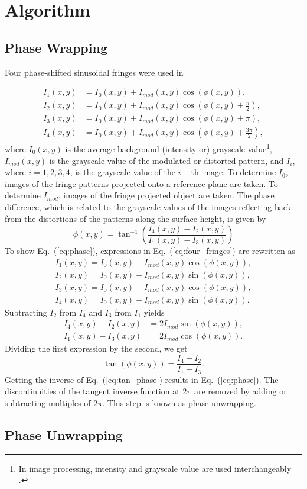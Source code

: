 \section{Algorithm}

\subsection{Phase Wrapping}
Four phase-shifted sinusoidal fringes were used in 

\begin{align}
I_1(x,y)&=I_0(x,y) + I_{mod}(x,y)\cos{(\phi(x,y))}, \nonumber\\
I_2(x,y)&=I_0(x,y) + I_{mod}(x,y)\cos{(\phi(x,y)+\frac{\pi}{2})}, \nonumber\\
I_3(x,y)&=I_0(x,y) + I_{mod}(x,y)\cos{(\phi(x,y)+\pi)},\nonumber\\
I_4(x,y)&=I_0(x,y) + I_{mod}(x,y)\cos{(\phi(x,y)+\frac{3\pi}{2})},
\label{eq:four_fringes}
\end{align}  
where $I_0(x,y)$ is the average background (intensity or) grayscale value\footnote{In image processing, intensity and grayscale value are used interchangeably \cite{Gonzales}.}, $I_{mod}(x,y)$ is the grayscale value of the modulated or distorted pattern, and $I_i$, where $i=1,2,3,4$, is the grayscale value of the $i-$th image. To determine $I_0$, images of the fringe patterns projected onto a reference plane are taken. 
To determine $I_{mod}$, images of the fringe projected object are taken. 
The phase difference, which is related to the grayscale values of the images reflecting back from the distortions of the patterns along the surface height, is given by
\begin{equation}
\phi(x,y)=\tan^{-1}{\left( \frac{I_4(x,y) - I_2(x,y)}{I_1(x,y)- I_3(x,y)}\right)}
\label{eq:phase}
\end{equation}
To show Eq.~(\ref{eq:phase}), expressions in Eq.~(\ref{eq:four_fringes}) are rewritten as 
\begin{align}
I_1(x,y)=I_0(x,y) + I_{mod}(x,y)\cos{(\phi(x,y))}, \nonumber\\
I_2(x,y)=I_0(x,y) - I_{mod}(x,y)\sin{(\phi(x,y))}, \nonumber\\
I_3(x,y)=I_0(x,y) - I_{mod}(x,y)\cos{(\phi(x,y))},\nonumber\\
I_4(x,y)=I_0(x,y) + I_{mod}(x,y)\sin{(\phi(x,y))}.
\label{eq:four_fringes2}
\end{align}  
Subtracting $I_2$ from $I_4$ and $I_3$ from $I_1$ yields
\begin{align}
I_4(x,y)-I_2(x,y)&=2I_{mod}\sin{(\phi(x,y))}, \nonumber\\
I_1(x,y)-I_3(x,y)&=2I_{mod}\cos{(\phi(x,y))}.
\end{align}  
Dividing the first expression by the second, we get
\begin{equation}
\tan(\phi(x,y))=\frac{I_4-I_2}{I_1-I_3}.
\label{eq:tan_phase}
\end{equation}
Getting the inverse of Eq.~(\ref{eq:tan_phase}) results in Eq.~(\ref{eq:phase}).  The discontinuities of the tangent inverse function at $2\pi$ are removed by adding or subtracting multiples of $2\pi$.  This step is known as phase unwrapping. 

\subsection{Phase Unwrapping}
